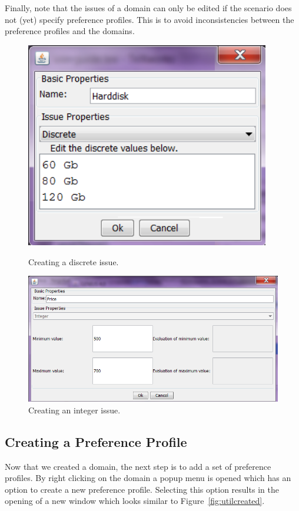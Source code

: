\documentclass[]{article}
\begin{document}
Finally, note that the issues of a domain can only be edited if the scenario does not (yet) specify preference profiles. This is to avoid inconsistencies between the preference profiles and the domains. 

\begin{figure}[ht]
\center
\begin{minipage}[b]{0.35\linewidth}
	\includegraphics[width=0.95\textwidth]{media/image7a.png}
\caption{Creating a discrete issue.}
\label{fig:createIssueD}
\end{minipage}
\begin{minipage}[b]{0.55\linewidth}
	\includegraphics[width=1.0\textwidth]{media/image7b.png}
\caption{Creating an integer issue.}\label{fig:createIssueI}
\end{minipage}
\end{figure}

\subsection{Creating a Preference Profile}
Now that we created a domain, the next step is to add a set of preference profiles. By right clicking on the domain a popup menu is opened which has an option to create a new preference profile. Selecting this option results in the opening of a new window which looks similar to Figure~\ref{fig:utilcreated}.
\end{document}
